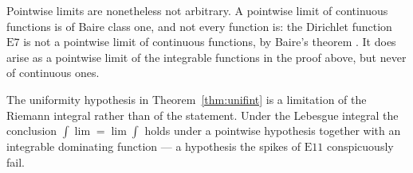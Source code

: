 \begin{remark}
Pointwise limits are nonetheless not arbitrary. A pointwise limit of
continuous functions is of Baire class one, and not every function is: the
Dirichlet function $\mathrm{E}7$ is not a pointwise limit of continuous
functions, by Baire's theorem \cite[Lect.~28]{yupin}. It does arise as a
pointwise limit of the integrable functions in the proof above, but never of
continuous ones.
\end{remark}

\begin{remark}
The uniformity hypothesis in Theorem~\ref{thm:unifint} is a limitation of the
Riemann integral rather than of the statement. Under the Lebesgue integral
the conclusion $\int \lim = \lim \int$ holds under a pointwise hypothesis
together with an integrable dominating function --- a hypothesis the spikes
of $\mathrm{E}11$ conspicuously fail.
\end{remark}
